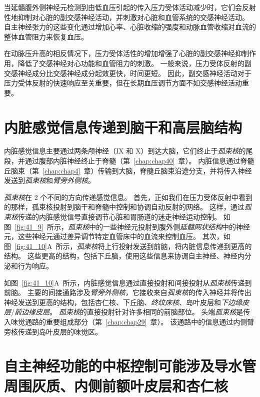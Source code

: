 当延髓腹外侧神经元检测到由低血压引起的传入压力受体活动减少时，它们会反射性地抑制对心脏的副交感神经活动，并刺激对心脏和血管系统的交感神经活动。
自主神经张力的这些变化通过增加心率、心脏收缩的强度和动脉血管收缩对血流的整体血管阻力来恢复血压。


在动脉压升高的相反情况下，压力受体活性的增加增强了心脏的副交感神经抑制作用，降低了交感神经对心功能和血管阻力的刺激。
一般来说，压力受体反射的副交感神经成分比交感神经成分起效更快，时间更短。
因此，副交感神经活动对于压力受体反射的快速响应至关重要，但在长期血压调节方面不如交感神经活动重要。



\section{内脏感觉信息传递到脑干和高层脑结构}

内脏感觉信息主要通过两条颅神经（IX 和 X）到达大脑，它们终止于\textit{孤束核}的尾段，并通过腹部内脏神经终止于脊髓（第~\ref{chap:chap40}~章）。
内脏信息通过脊髓丘脑束（第~\ref{chap:chap4}~章）传输到大脑，脊髓丘脑束沿途分支，并将传入神经发送到\textit{孤束核}和\textit{臂旁外侧核}。


\textit{孤束核}在 2 个不同的方向传递感觉信息。
首先，正如我们在压力受体反射中看到的那样，孤束核投射到脑干和脊髓中控制和协调自动反射的网络。
这样，通过\textit{孤束核}传递的内脏感觉信号直接调节心脏和胃肠道的迷走神经运动控制。
如图~\ref{fig:41_9}~所示，\textit{孤束核}中的一些神经元投射到腹外侧\textit{延髓网状结构}中的神经元，这些神经元通过差异调节特定血管床中的血流来控制血压。
其次，如图~\ref{fig:41_10}A~所示，\textit{孤束核}将上行投射发送到前脑，将内脏信息传递到更高的结构。
这些更高的结构，包括下丘脑，使用这些信息来协调自主神经、神经内分泌和行为响应。


如图~\ref{fig:41_10}A~所示，内脏感觉信息通过直接投射和间接投射从\textit{孤束核}传递到前脑。
主要的间接通路涉及\textit{臂旁外侧核}，它接收来自\textit{孤束核}的传入神经并将传出神经发送到更高的结构，包括杏仁核、下丘脑、\textit{终纹床核}、岛叶皮层和\textit{下边缘皮层}/\textit{前边缘皮层}。
\textit{孤束核}的直接投射针对许多相同的前脑部位。
头端\textit{孤束核}是传入味觉通路的重要组成部分（第~\ref{chap:chap29}~章）。
该通路中的信息通过内侧臂旁核传递到岛叶皮层的味觉区。



\section{自主神经功能的中枢控制可能涉及导水管周围灰质、内侧前额叶皮层和杏仁核}

